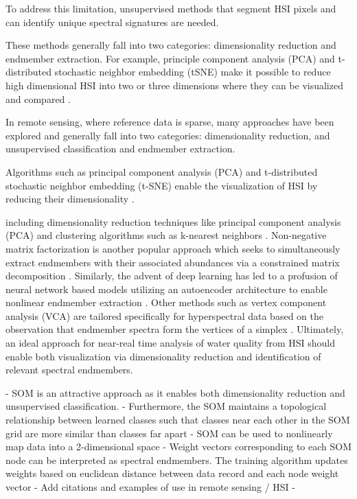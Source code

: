 \documentclass{article}
\begin{document}

To address this limitation, unsupervised methods that segment HSI pixels and can identify unique spectral signatures are needed. 

These methods generally fall into two categories: dimensionality reduction and endmember extraction. For example, principle component analysis (PCA) and t-distributed stochastic neighbor embedding (tSNE) make it possible to reduce high dimensional HSI into two or three dimensions where they can be visualized and compared \cite{}. 

In remote sensing, where reference data is sparse, many approaches have been explored and generally fall into two categories: dimensionality reduction, and unsupervised classification and endmember extraction. 

Algorithms such as principal component analysis (PCA) and t-distributed stochastic neighbor embedding (t-SNE) enable the visualization of HSI by reducing their dimensionality \cite{yousefi2016mineral}.

including dimensionality reduction techniques like principal component analysis (PCA) and clustering algorithms such as k-nearest neighbors \cite{yousefi2016mineral,cariou2015unsupervised}. Non-negative matrix factorization is another popular approach which seeks to simultaneously extract endmembers with their associated abundances via a constrained matrix decomposition \cite{Feng2022HyperspectralUB}. Similarly, the advent of deep learning has led to a profusion of neural network based models utilizing an autoencoder architecture to enable nonlinear endmember extraction \cite{su2019daen,borsoi2019deep,palsson2020convolutional}. Other methods such as vertex component analysis (VCA) are tailored specifically for hyperspectral data based on the observation that endmember spectra form the vertices of a simplex \cite{nascimento2005vertex}. Ultimately, an ideal approach for near-real time analysis of water quality from HSI should enable both visualization via dimensionality reduction and identification of relevant spectral endmembers.


- SOM is an attractive approach as it enables both dimensionality reduction and unsupervised classification. 
- Furthermore, the SOM maintains a topological relationship between learned classes such that classes near each other in the SOM grid are more similar than classes far apart
- SOM can be used to nonlinearly map data into a 2-dimensional space
- Weight vectors corresponding to each SOM node can be interpreted as spectral endmembers. The training algorithm updates weights based on euclidean distance between data record and each node weight vector
- Add citations and examples of use in remote sensing / HSI
- 
\end{document}
